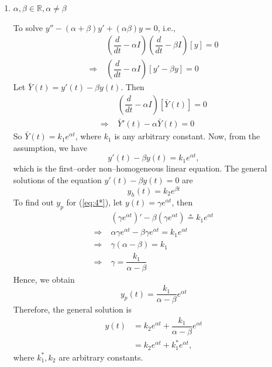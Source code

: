 \begin{enumerate}[label={\textbf{Case \arabic*:}}, leftmargin=50pt]
	\item $\alpha, \beta \in \mathbb{R}, \alpha \neq \beta$
	
	To solve $y'' - (\alpha + \beta) y' + (\alpha \beta) y = 0$, i.e.,
	\[
		\begin{aligned}
			&\left(\dfrac{d}{dt} - \alpha I\right) \left(\dfrac{d}{dt} - \beta I\right) [y] = 0\\
			\Rightarrow\;& \left(\dfrac{d}{dt} - \alpha I\right)[y' - \beta y] = 0
		\end{aligned}
	\]
	Let $\bar{Y}(t) = y'(t) - \beta y(t)$. Then
	\[
		\begin{aligned}
			&\left(\dfrac{d}{dt} - \alpha I\right) [\bar{Y}(t)] = 0\\
			\Rightarrow\;& \bar{Y}'(t) - \alpha \bar{Y}(t) = 0
		\end{aligned}
	\]
	So $\bar{Y}(t) = k_{1}e^{\alpha t}$, where $k_{1}$ is any arbitrary constant. Now, from the assumption, we have
	\begin{equation}
		\label{eq:4*}
		y'(t) - \beta y(t) = k_{1}e^{\alpha t},
	\end{equation}
	which is the first--order non--homogeneous linear equation. The general solutions of the equation $y'(t) - \beta y(t) = 0$ are
	\[
		y_h(t) = k_{2} e^{\beta t}
	\]
	To find out $y_{p}$ for (\ref{eq:4*}), let $y(t) = \gamma e^{\alpha t}$, then
	\[
		\begin{aligned}
			&(\gamma e^{\alpha t})' - \beta (\gamma e^{\alpha t}) \overset{*}{=} k_{1} e^{\alpha t}\\
			\Rightarrow\;& \alpha \gamma e^{\alpha t} - \beta \gamma e^{\alpha t} = k_{1}e^{\alpha t}\\
			\Rightarrow\;& \gamma(\alpha - \beta) = k_{1}\\
			\Rightarrow\;& \gamma = \dfrac{k_{1}}{\alpha - \beta}
		\end{aligned}
	\]
	Hence, we obtain
	\[
		y_{p}(t) = \dfrac{k_{1}}{\alpha - \beta} e^{\alpha t}
	\]
	Therefore, the general solution is
	\[
		\begin{aligned}
			y(t) &= k_{2}e^{\alpha t} + \dfrac{k_{1}}{\alpha - \beta} e^{\alpha t}\\
			&= k_{2}e^{\alpha t} + k_{1}^{*} e^{\alpha t},
		\end{aligned}
	\]
	where $k_{1}^{*}, k_{2}$ are arbitrary constants.
\end{enumerate}
